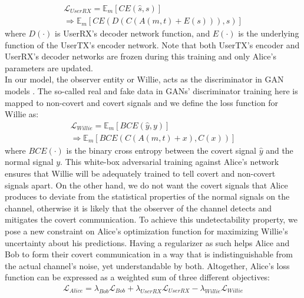 \begin{equation}
	\begin{array}{l} \label{alice_user_loss}
	\mathcal{L}_{UserRX} = \mathbb{E}_{m}[CE(\hat{s}, s)] \\ \Rightarrow \mathbb{E}_{m}[CE(D(C(A(m, t) + E(s))), s)]
	\end{array}
\end{equation}
where \(D(\cdot)\) is UserRX's decoder network function, and \(E(\cdot)\) is the underlying function of the UserTX's encoder network. Note that both UserTX's encoder and UserRX's decoder networks are frozen during this training and only Alice's parameters are updated.\\
In our model, the observer entity or Willie, acts as the discriminator in GAN models \cite{goodfellow2014generative}. The so-called real and fake data in GANs' discriminator training here is mapped to non-covert and covert signals and we define the loss function for Willie as:
\begin{equation}
		\begin{array}{l} \label{willie_loss}
	\mathcal{L}_{Willie} = \mathbb{E}_{m}[BCE(\hat{y}, y)] \\ \Rightarrow \mathbb{E}_{m}[BCE(C(A(m,t) + x), C(x))]
	\end{array}
\end{equation}
where \(BCE(\cdot)\) is the binary cross entropy between the covert signal \(\hat{y}\) and the normal signal \(y\). This white-box adversarial training against Alice's network ensures that Willie will be adequately trained to tell covert and non-covert signals apart. On the other hand, we do not want the covert signals that Alice produces to deviate from the statistical properties of the normal signals on the channel, otherwise it is likely that the observer of the channel detects and mitigates the covert communication. To achieve this undetectability property, we pose a new constraint on Alice's optimization function for maximizing Willie's uncertainty about his predictions. Having a regularizer as such helps Alice and Bob to form their covert communication in a way that is indistinguishable from the actual channel's noise, yet understandable by both. Altogether, Alice's loss function can be expressed as a weighted sum of three different objectives:
\begin{equation}
	\begin{array}{l} \label{alice_loss}
	\mathcal{L}_{Alice} = \lambda_{Bob} \mathcal{L}_{Bob} + \lambda_{UserRX} \mathcal{L}_{UserRX} - \lambda_{Willie} \mathcal{L}_{Willie}
\end{array}
\end{equation}
